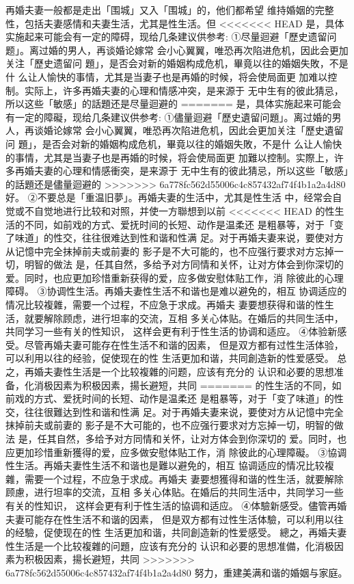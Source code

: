 \documentclass[12pt,UTF8]{ctexbook}
\begin{document}
再婚夫妻一般都是走出「围城」又入「围城」的，他们都希望
维持婚姻的完整性，包括夫妻感情和夫妻生活，尤其是性生活。但
<<<<<<< HEAD
是，具体实施起来可能会有一定的障碍，现给几条建议供参考:
①尽量迴避「歷史遗留问题」。离过婚的男人，再谈婚论嫁常
会小心翼翼，唯恐再次陷进危机，因此会更加关注「歷史遗留问
題」，是否会对新的婚姻构成危机，畢竟以往的婚姻失敗，不是什
么让人愉快的事情，尤其是当妻子也是再婚的时候，将会使局面更
加难以控制。实际上，许多再婚夫妻的心理和情感冲突，是来源于
无中生有的彼此猜忌，所以这些「敏感」的話題还是尽量迴避的
=======
是，具体实施起来可能会有一定的障礙，现给几条建议供参考:
①儘量迴避「歷史遺留问題」。离过婚的男人，再谈婚论嫁常
会小心翼翼，唯恐再次陷进危机，因此会更加关注「歷史遺留问
題」，是否会对新的婚姻构成危机，畢竟以往的婚姻失敗，不是什
么让人愉快的事情，尤其是当妻子也是再婚的时候，将会使局面更
加難以控制。实際上，许多再婚夫妻的心理和情感衝突，是来源于
无中生有的彼此猜忌，所以这些「敏感」的話題还是儘量迴避的
>>>>>>> 6a778fc562d55006c4c857432af74f4b1a2a4d80
好。
②不要总是「重温旧夢」。再婚夫妻的生活中，尤其是性生活
中，经常会自觉或不自觉地进行比较和对照，并使一方聯想到以前
<<<<<<< HEAD
的性生活的不同，如前戏的方式、爱抚时间的长短、动作是温柔还
是粗暴等，对于「变了味道」的性交，往往很难达到性和谐和性满
足。对于再婚夫妻来说，要使对方从记憶中完全抹掉前夫或前妻的
影子是不大可能的，也不应强行要求对方忘掉一切，明智的做法
是，任其自然，多给予对方同情和关怀，让对方体会到你深切的
爱。同时，也应更加珍惜重新获得的爱，应多做安慰体贴工作，消
除彼此的心理障碍。
③协调性生活。再婚夫妻性生活不和谐也是难以避免的，相互
协调适应的情况比较複雜，需要一个过程，不应急于求成。再婚夫
妻要想获得和谐的性生活，就要解除顾虑，进行坦率的交流，互相
多关心体贴。在婚后的共同生活中，共同学习一些有关的性知识，
这样会更有利于性生活的协调和适应。
④体验新感受。尽管再婚夫妻可能存在性生活不和谐的因素，
但是双方都有过性生活体验，可以利用以往的经验，促使现在的性
生活更加和谐，共同創造新的性爱感受。
总之，再婚夫妻性生活是一个比较複雜的问题，应该有充分的
认识和必要的思想准备，化消极因素为积极因素，揚长避短，共同
=======
的性生活的不同，如前戏的方式、爱抚时间的长短、动作是温柔还
是粗暴等，对于「变了味道」的性交，往往很難达到性和谐和性满
足。对于再婚夫妻来说，要使对方从记憶中完全抹掉前夫或前妻的
影子是不大可能的，也不应强行要求对方忘掉一切，明智的做法
是，任其自然，多给予对方同情和关怀，让对方体会到你深切的
爱。同时，也应更加珍惜重新獲得的爱，应多做安慰体贴工作，消
除彼此的心理障礙。
③協调性生活。再婚夫妻性生活不和谐也是難以避免的，相互
協调适应的情况比较複雜，需要一个过程，不应急于求成。再婚夫
妻要想獲得和谐的性生活，就要解除顾慮，进行坦率的交流，互相
多关心体贴。在婚后的共同生活中，共同学习一些有关的性知识，
这样会更有利于性生活的協调和适应。
④体驗新感受。儘管再婚夫妻可能存在性生活不和谐的因素，
但是双方都有过性生活体驗，可以利用以往的经驗，促使现在的性
生活更加和谐，共同創造新的性爱感受。
總之，再婚夫妻性生活是一个比较複雜的问題，应该有充分的
认识和必要的思想准備，化消极因素为积极因素，揚长避短，共同
>>>>>>> 6a778fc562d55006c4c857432af74f4b1a2a4d80
努力，重建美满和谐的婚姻与家庭。
\end{document}
